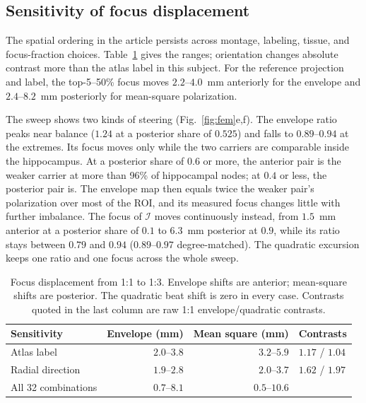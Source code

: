 \subsection{Sensitivity of focus displacement}\label{supp:fem-sensitivities}
The spatial ordering in the article persists across montage, labeling, tissue,
and focus-fraction choices. Table~\ref{tab:fem-sensitivities} gives the ranges;
orientation changes absolute contrast more than the atlas label in this subject.
For the reference projection and label, the top-5--50\% focus moves
$2.2$--$4.0$~mm anteriorly for the envelope and $2.4$--$8.2$~mm posteriorly
for mean-square polarization.

The sweep shows two kinds of steering (Fig.~\ref{fig:fem}e,f). The envelope ratio peaks
near balance ($1.24$ at a posterior share of $0.525$) and falls to $0.89$--$0.94$ at
the extremes. Its focus moves only while the two carriers are comparable inside the
hippocampus. At a posterior share of $0.6$ or more, the anterior pair is the weaker
carrier at more than 96\% of hippocampal nodes; at $0.4$ or less, the posterior pair is. The
envelope map then equals twice the weaker pair's polarization over most of the ROI,
and its measured focus changes little with further imbalance. The focus of $\mathcal I$ moves
continuously instead, from $1.5$~mm anterior at a posterior share of $0.1$ to $6.3$~mm
posterior at $0.9$, while its ratio stays between $0.79$ and $0.94$ ($0.89$--$0.97$
degree-matched). The quadratic excursion keeps one ratio and one focus across the
whole sweep.

\begin{table}[htbp]\centering\small
\caption{Focus displacement from 1:1 to 1:3. Envelope shifts are anterior;
mean-square shifts are posterior. The quadratic beat shift is zero in every case.
Contrasts quoted in the last column are raw 1:1 envelope/quadratic contrasts.}
\label{tab:fem-sensitivities}
\begin{tabular}{@{}lrrl@{}}
\toprule
Sensitivity & Envelope (mm) & Mean square (mm) & Contrasts\\
\midrule
Atlas label & $2.0$--$3.8$ & $3.2$--$5.9$ & $1.17$ / $1.04$\\
Radial direction & $1.9$--$2.8$ & $2.0$--$3.7$ & $1.62$ / $1.97$\\
All 32 combinations & $0.7$--$8.1$ & $0.5$--$10.6$ & \\
\bottomrule
\end{tabular}
\end{table}



